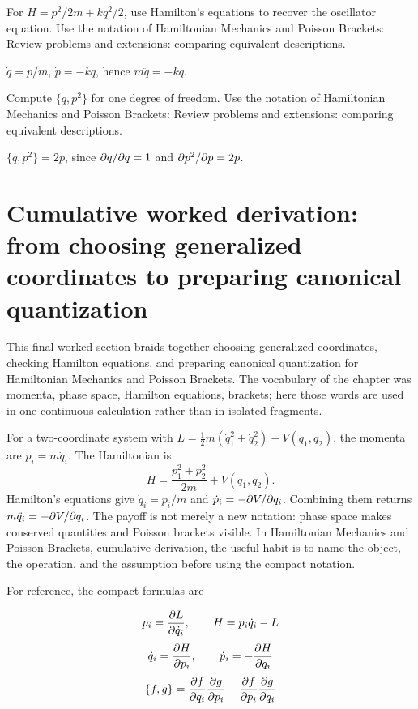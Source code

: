 \begin{exercise}
For \(H=p^2/2m+kq^2/2\), use Hamilton's equations to recover the oscillator equation.  Use the notation of Hamiltonian Mechanics and Poisson Brackets: Review problems and extensions: comparing equivalent descriptions.
\begin{answer}
\(\dot q=p/m\), \(\dot p=-kq\), hence \(m\ddot q=-kq\).
\end{answer}
\end{exercise}

\begin{exercise}
Compute \(\{q,p^2\}\) for one degree of freedom.  Use the notation of Hamiltonian Mechanics and Poisson Brackets: Review problems and extensions: comparing equivalent descriptions.
\begin{answer}
\(\{q,p^2\}=2p\), since \(\partial q/\partial q=1\) and \(\partial p^2/\partial p=2p\).
\end{answer}
\end{exercise}



\section{Cumulative worked derivation: from choosing generalized coordinates to preparing canonical quantization}

This final worked section braids together choosing generalized coordinates, checking Hamilton equations, and preparing canonical quantization for Hamiltonian Mechanics and Poisson Brackets.  The vocabulary of the chapter was momenta, phase space, Hamilton equations, brackets; here those words are used in one continuous calculation rather than in isolated fragments.

For a two-coordinate system with \(L=\frac12m(\dot q_1^2+\dot q_2^2)-V(q_1,q_2)\), the momenta are \(p_i=m\dot q_i\).  The Hamiltonian is
\[
  H=\frac{p_1^2+p_2^2}{2m}+V(q_1,q_2).
\]
Hamilton's equations give \(\dot q_i=p_i/m\) and \(\dot p_i=-\partial V/\partial q_i\).  Combining them returns \(m\ddot q_i=-\partial V/\partial q_i\).  The payoff is not merely a new notation: phase space makes conserved quantities and Poisson brackets visible.  In Hamiltonian Mechanics and Poisson Brackets, cumulative derivation, the useful habit is to name the object, the operation, and the assumption before using the compact notation.

For reference, the compact formulas are

\[
  p_i=\frac{\partial L}{\partial\dot q_i},\qquad H=p_i\dot q_i-L
\]
\[
  \dot q_i=\frac{\partial H}{\partial p_i},\qquad \dot p_i=-\frac{\partial H}{\partial q_i}
\]
\[
  \{f,g\}=\frac{\partial f}{\partial q_i}\frac{\partial g}{\partial p_i}-\frac{\partial f}{\partial p_i}\frac{\partial g}{\partial q_i}
\]

